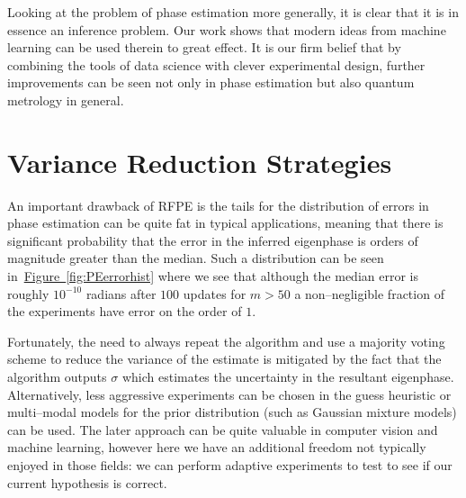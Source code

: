 \documentclass[aps,pra,amsmath,twocolumn,amssymb,superscriptaddress]{revtex4-1}
\newcommand{\fig}[1]{\hyperref[fig:#1]{Figure~\ref*{fig:#1}}}
\begin{document}
Looking at the problem of phase estimation more generally, it is clear that it is in essence an inference problem.
Our work shows that modern ideas from machine learning can be used therein to great effect.  
It is our firm belief that by combining the tools of data science with clever experimental design,
further improvements can be seen not only in phase estimation but also quantum metrology in general.


% 

\pagebreak
\appendix


\onecolumngrid

\section{Variance Reduction Strategies}
\label{app:var-reduction}

An important drawback of RFPE is  the tails for the distribution of errors in phase estimation can be quite fat in typical applications, meaning that there is significant probability that the error in the inferred eigenphase is orders of magnitude greater than the median.  Such a distribution can be seen in~\fig{PEerrorhist} where we see that although the median error is roughly $10^{-10}$ radians after $100$ updates for $m>50$  a non--negligible fraction of the experiments have error on the order of $1$.    

Fortunately, the need to always repeat the algorithm and use a majority voting scheme to reduce the variance of the estimate is mitigated by the fact that the algorithm outputs $\sigma$ which estimates the uncertainty in the resultant eigenphase. 
Alternatively, less aggressive experiments can be chosen in the guess heuristic or multi--modal models for the prior distribution (such as Gaussian mixture models) can be used.  The later approach can be quite valuable in computer vision and machine learning, however here we have an additional freedom not typically enjoyed in those fields: we can perform adaptive experiments to test to see if our current hypothesis is correct.
\end{document}
